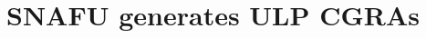 \chapter{SNAFU generates ULP CGRAs}
\label{chapter:snafu}

\newcommand{\snafuframe}{\snafu}
\newcommand{\snafuarch}{{\protect\fauxsc{Snafu-Arch}}\xspace}
\newcommand*\circled[1]{\tikz[baseline=(char.base)]{\node[shape=circle,draw,inner sep=0.5pt] (char) {#1};}}
\newcommand{\bigemph}[1]{\emph{\bfseries #1}}
\newcommand{\ucore}{\textmu core\xspace}
\newcommand{\ucfg}{\textmu cfg\xspace}











